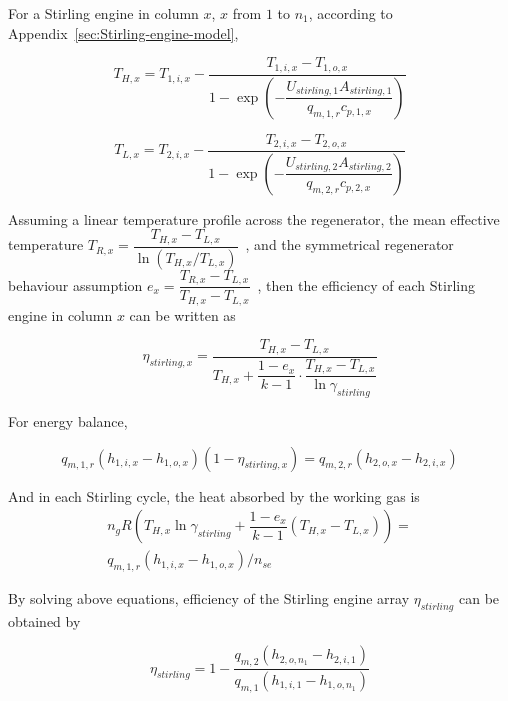 \documentclass{article}
\begin{document}
For a Stirling engine in column $x$, $x$ from $1$ to $n_1$, according to Appendix~\ref{sec:Stirling-engine-model},

\begin{equation*}
	T_{H,x}=T_{1,i,x}-\dfrac{T_{1,i,x}-T_{1,o,x}}{1-\exp(-\dfrac{U_{stirling,1}A_{stirling,1}}{q_{m,1,r}c_{p,1,x}})}\label{eq:T_H_x}
\end{equation*}


\begin{equation*}
	T_{L,x}=T_{2,i,x}-\dfrac{T_{2,i,x}-T_{2,o,x}}{1-\exp(-\dfrac{U_{stirling,2}A_{stirling,2}}{q_{m,2,r}c_{p,2,x}})}\label{eq:T_L_x}
\end{equation*}

Assuming a linear temperature profile across the regenerator, the mean effective temperature $T_{R,x}=\dfrac{T_{H,x}-T_{L,x}}{\ln(T_{H,x}/T_{L,x})}$~\cite{Der2007,Cavazzuti2012}, and the symmetrical regenerator behaviour assumption $e_{x}=\dfrac{T_{R,x}-T_{L,x}}{T_{H,x}-T_{L,x}}$~\cite{Formosa2010,Juhasz2010}, then the efficiency of each Stirling engine in column $x$ can be written as~\cite{Stine1985,Goswami2015}

\begin{equation*}
	\eta_{stirling,x}=\dfrac{T_{H,x}-T_{L,x}}{T_{H,x}+\dfrac{1-e_{x}}{k-1}\cdot\dfrac{T_{H,x}-T_{L,x}}{\ln\gamma_{stirling}}}\label{eq:eta_striling_x}
\end{equation*}

For energy balance,

\begin{equation*}
	q_{m,1,r}(h_{1,i,x}-h_{1,o,x})(1-\eta_{stirling,x})=q_{m,2,r}(h_{2,o,x}-h_{2,i,x})
\end{equation*}

And in each Stirling cycle, the heat absorbed by the working gas is 
\begin{equation*}
\begin{split}
	n_gR\left(T_{H,x}\ln\gamma_{stirling}+\dfrac{1-e_{x}}{k-1}\left(T_{H,x}-T_{L,x}\right)\right)=\\q_{m,1,r}(h_{1,i,x}-h_{1,o,x})/n_{se}
\end{split}
\end{equation*}

By solving above equations, efficiency of the Stirling engine array $\eta_{stirling}$ can be obtained by

\begin{equation*}
	\eta_{stirling}=1-\dfrac{q_{m,2}(h_{2,o,n_1}-h_{2,i,1})}{q_{m,1}(h_{1,i,1}-h_{1,o,n_1})}\label{eq:eta_stirling-1}
\end{equation*}
\end{document}
